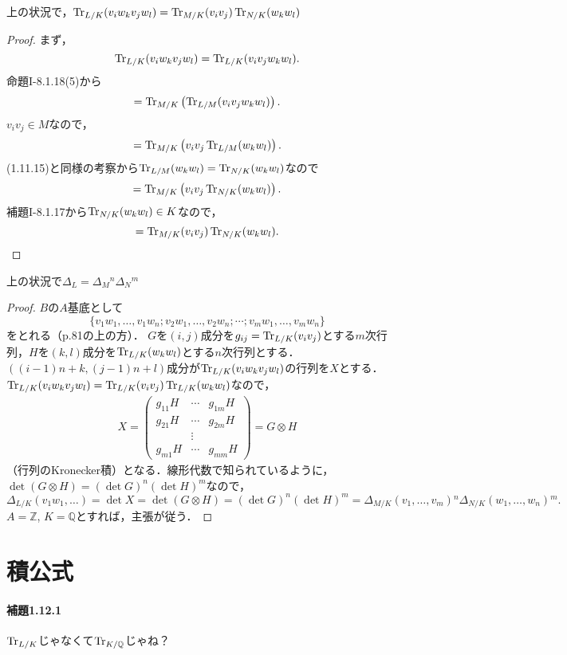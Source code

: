 \begin{screen}
  上の状況で，$\operatorname{Tr}_{L/K}(v_iw_kv_jw_l)=\operatorname{Tr}_{M/K}(v_iv_j)\operatorname{Tr}_{N/K}(w_kw_l)$
\end{screen}
\begin{proof}
  まず，
  \[\operatorname{Tr}_{L/K}(v_iw_kv_jw_l)=\operatorname{Tr}_{L/K}(v_iv_jw_kw_l).\]
  命題I-8.1.18(5)から
  \[=\operatorname{Tr}_{M/K}\left(\operatorname{Tr}_{L/M}(v_iv_jw_kw_l)\right).\]
  $v_iv_j\in M$なので，
  \[=\operatorname{Tr}_{M/K}\left(v_iv_j\operatorname{Tr}_{L/M}(w_kw_l)\right).\]
  (1.11.15)と同様の考察から$\operatorname{Tr}_{L/M}(w_kw_l)=\operatorname{Tr}_{N/K}(w_kw_l)$なので
  \[=\operatorname{Tr}_{M/K}\left(v_iv_j\operatorname{Tr}_{N/K}(w_kw_l)\right).\]
  補題I-8.1.17から$\operatorname{Tr}_{N/K}(w_kw_l)\in K$なので，
  \[=\operatorname{Tr}_{M/K}(v_iv_j)\operatorname{Tr}_{N/K}(w_kw_l).\]
\end{proof}

\begin{screen}
  上の状況で$\varDelta_L=\varDelta_M{}^n\varDelta_N{}^m$
\end{screen}
\begin{proof}
  $B$の$A$基底として
  \[\{v_1w_1,\ldots,v_1w_n;v_2w_1,\ldots,v_2w_n;\cdots;v_mw_1,\ldots,v_mw_n\}\]
  をとれる（p.81の上の方）．
  $G$を$(i,j)$成分を$g_{ij}=\operatorname{Tr}_{L/K}(v_iv_j)$とする$m$次行列，$H$を$(k,l)$成分を$\operatorname{Tr}_{L/K}(w_kw_l)$とする$n$次行列とする．
  $((i-1)n+k,(j-1)n+l)$成分が$\operatorname{Tr}_{L/K}(v_iw_kv_jw_l)$の行列を$X$とする．
  $\operatorname{Tr}_{L/K}(v_iw_kv_jw_l)=\operatorname{Tr}_{L/K}(v_iv_j)\operatorname{Tr}_{L/K}(w_kw_l)$なので，
  \begin{align*}
    X=
    \begin{pmatrix}
      g_{11}H & \cdots & g_{1m}H \\
      g_{21}H & \cdots & g_{2m}H \\
      & \vdots & \\
      g_{m1}H & \cdots & g_{mm}H
    \end{pmatrix}
    =G\otimes H
  \end{align*}
  （行列のKronecker積）となる．線形代数で知られているように，$\det(G\otimes H)=(\det G)^n(\det H)^m$なので，
  \[\varDelta_{L/K}(v_1w_1,\ldots)=\det X=\det(G\otimes H)=(\det G)^n(\det H)^m=\varDelta_{M/K}(v_1,\ldots,v_m){}^n\varDelta_{N/K}(w_1,\ldots,w_n){}^m.\]
  $A=\mathbb{Z}$, $K=\mathbb{Q}$とすれば，主張が従う．
\end{proof}


\section{積公式}
\paragraph{補題1.12.1}
$\operatorname{Tr}_{L/K}$じゃなくて$\operatorname{Tr}_{K/\mathbb{Q}}$じゃね？

